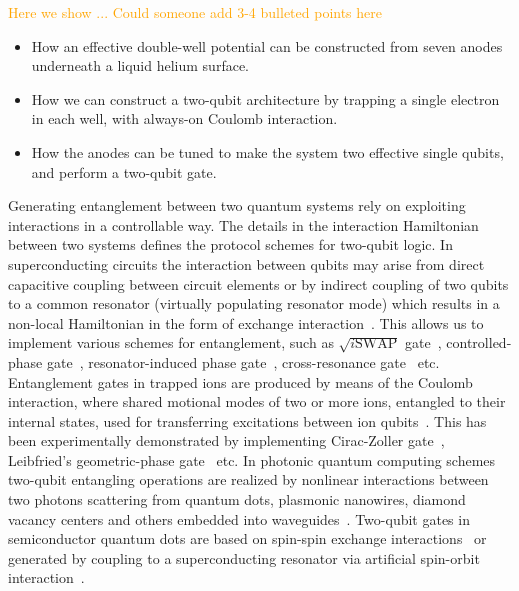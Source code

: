 \documentclass[twocolumn,superscriptaddress,unsortedaddress,
 amsmath,amssymb,
 aps,
]{revtex4-2}
\newcommand{\may}[1]{\textcolor{orange}{#1}}
\begin{document}
\may{{Here we show ... Could someone add 3-4 bulleted points here}}
\begin{itemize}
    \item How an effective double-well potential can be constructed from seven
        anodes underneath a liquid helium surface.
    \item How we can construct a two-qubit architecture by trapping a single
        electron in each well, with always-on Coulomb interaction.
    \item How the anodes can be tuned to make the system two effective single
        qubits, and perform a two-qubit gate.
\end{itemize}








Generating entanglement between two quantum systems rely on exploiting interactions in a controllable way. The details in the interaction Hamiltonian between two systems defines the protocol schemes for two-qubit logic. In superconducting circuits the interaction between qubits may arise from direct capacitive coupling between circuit elements or by indirect coupling of two qubits to a common resonator (virtually populating resonator mode) which results in a non-local Hamiltonian in the form of exchange interaction~\cite{blais2020circuit}. This allows us to implement various schemes for entanglement, such as $\sqrt{i\text{SWAP}}$ gate~\cite{bialczak2010quantum}, controlled-phase gate~\cite{dicarlo2009demonstration}, resonator-induced phase gate~\cite{paik2016experimental}, cross-resonance gate~\cite{chow2011simple} etc. Entanglement gates in trapped ions are produced by means of the Coulomb interaction, where shared motional modes of two or more ions, entangled to their internal states, used for transferring excitations between ion qubits~\cite{cirac1995quantum}. This has been experimentally demonstrated by implementing Cirac-Zoller gate~\cite{turchette1998deterministic}, Leibfried’s geometric-phase gate~\cite{leibfried2003experimental} etc. In photonic quantum computing schemes two-qubit entangling operations are realized by nonlinear interactions between two photons scattering from quantum dots, plasmonic nanowires, diamond vacancy centers and others embedded into waveguides~\cite{bartlett2020universal}. Two-qubit gates in semiconductor quantum dots are based on spin-spin exchange interactions~\cite{brunner2011two,watson2018programmable} or generated by coupling to a superconducting resonator via artificial spin-orbit interaction~\cite{borjans2020resonant}.
\end{document}
